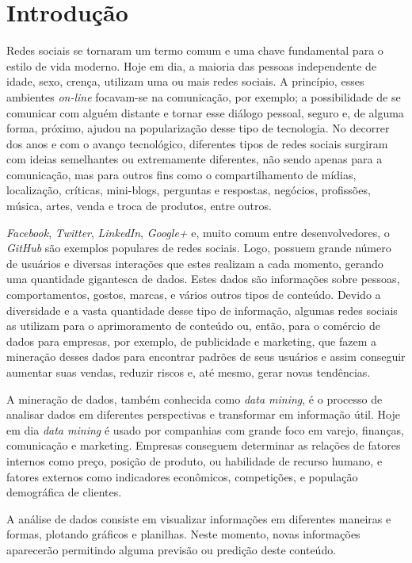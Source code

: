 \chapter{Introdução}\label{ch:introducao}

Redes sociais se tornaram um termo comum e uma chave fundamental para o estilo de vida moderno. Hoje em dia, a maioria das pessoas independente de idade, sexo, crença, utilizam uma ou mais redes sociais. A princípio, esses ambientes \textit{on-line} focavam-se na comunicação, por exemplo; a possibilidade de se comunicar com alguém distante e tornar esse diálogo pessoal, seguro e, de alguma forma, próximo, ajudou na popularização desse tipo de tecnologia. No decorrer dos anos e com o avanço tecnológico, diferentes tipos de redes sociais surgiram com ideias semelhantes ou extremamente diferentes, não sendo apenas para a comunicação, mas para outros fins como o compartilhamento de mídias, localização, críticas, mini-blogs, perguntas e respostas, negócios, profissões, música, artes, venda e troca de produtos, entre outros.

\textit{Facebook}, \textit{Twitter}, \textit{LinkedIn}, \textit{Google+} e, muito comum entre desenvolvedores, o \textit{GitHub} são exemplos populares de redes sociais. Logo, possuem grande número de usuários e diversas interações que estes realizam a cada momento, gerando uma quantidade gigantesca de dados. Estes dados são informações sobre pessoas, comportamentos, gostos, marcas, e vários outros tipos de conteúdo. Devido a diversidade e a vasta quantidade desse tipo de informação, algumas redes sociais as utilizam para o aprimoramento de conteúdo ou, então, para o comércio de dados para empresas, por exemplo, de publicidade e marketing, que fazem a mineração desses dados para encontrar padrões de seus usuários e assim conseguir aumentar suas vendas, reduzir riscos e, até mesmo, gerar novas tendências.

A mineração de dados, também conhecida como \textit{data mining}, é o processo de analisar dados em diferentes perspectivas e transformar em informação útil. Hoje em dia \textit{data mining} é usado por companhias com grande foco em varejo, finanças, comunicação e marketing. Empresas conseguem determinar as relações de fatores internos como preço, posição de produto, ou habilidade de recurso humano, e fatores externos como indicadores econômicos, competições, e população demográfica de clientes.

A análise de dados consiste em visualizar informações em diferentes maneiras e formas, plotando gráficos e planilhas. Neste momento, novas informações aparecerão permitindo alguma previsão ou predição deste conteúdo.

